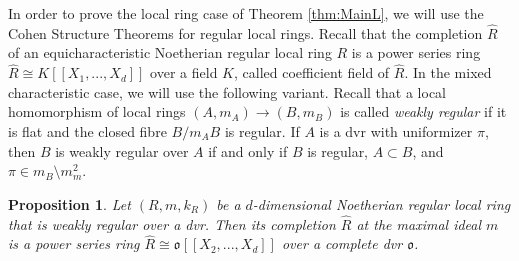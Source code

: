 \documentclass[10pt,twoside,a4paper,reqno]{amsart}
\newtheorem{proposition}[theorem]{Proposition}
\theoremstyle{definition}
\numberwithin{equation}{section}
\renewcommand{\|}{\operatorname{|}}
\newcommand{\ooo}{\mathfrak{o}}
\begin{document}
In order to prove the local ring case of Theorem \ref{thm:MainL}, we will use the Cohen Structure Theorems for regular local rings.
Recall \cite[Theorem 29.7]{Matsumura} that the completion $\hat{R}$ of an equicharacteristic Noetherian regular local ring $R$ is a power series ring $\hat{R}\cong K[[X_1,...,X_d]]$ over a field $K$, called coefficient field of $\hat{R}$.
In the mixed characteristic case, we will use the following variant.
Recall \cite{FoxbyEtc} that a local homomorphism of local rings $(A,m_A) \to (B,m_B)$ is called {\em weakly regular} if it is flat and the closed fibre $B/m_AB$ is regular.
If $A$ is a dvr with uniformizer $\pi$, then $B$ is weakly regular over $A$ if and only if $B$ is regular, $A \subset B$, and $\pi \in m_B\setminus m_m^2$.

\begin{proposition}
\label{prop:CohenFlattening}
Let $(R,m,k_R)$ be a $d$-dimensional Noetherian regular local ring that is weakly regular over a dvr.
Then its completion $\hat{R}$ at the maximal ideal $m$ is a power series ring $\hat{R}\cong \ooo[[X_2,...,X_d]]$ over a complete dvr $\ooo$.
\end{proposition}
\end{document}
